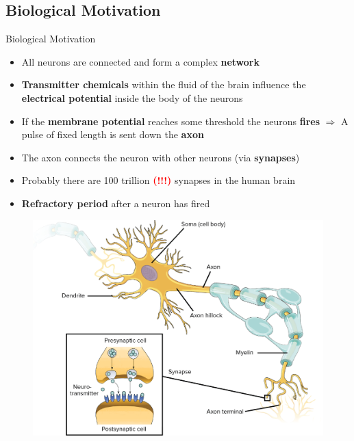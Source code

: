 \subsection{Biological Motivation}

\begin{frame}{Biological Motivation}{}
	\begin{itemize}
		\item All neurons are connected and form a complex \textbf{network}
		\item \textbf{Transmitter chemicals} within the fluid of the brain influence the
			\textbf{electrical potential} inside the body of the neurons
		\item If the \textbf{membrane potential} reaches some threshold the neurons \textbf{fires}
			$\Rightarrow$ A pulse of fixed length is sent down the \textbf{axon}
		\item The axon connects the neuron with other neurons (via \textbf{synapses})
		\item Probably there are 100 trillion \textcolor{red}{\textbf{(!!!)}} synapses in the human brain
		\item \textbf{Refractory period} after a neuron has fired
	\end{itemize}
\end{frame}


\begin{frame}[plain]{}{}
	\begin{figure}
		\centering
		\includegraphics[scale=0.50]{10_deep_learning/02_img/biological_neuron}
	\end{figure}
\end{frame}


